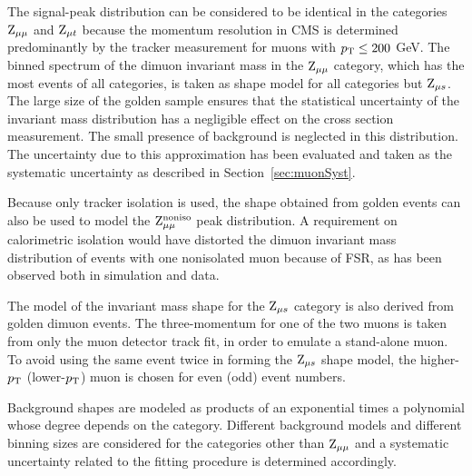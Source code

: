 The signal-peak distribution can be considered to be identical in the categories
$\mathrm{Z}_{\mu\mu}$ and $\mathrm{Z}_{\mu t}$  because the momentum resolution in CMS is determined predominantly
by the tracker measurement for muons with $p_{\mathrm{T}} \leq 200$ GeV.
The binned spectrum of the dimuon invariant mass in the
$\mathrm{Z}_{\mu\mu}$ category, which has the most events of all categories,
is taken as shape model for all categories but $\mathrm{Z}_{\mu s}$.
The large size of the golden sample ensures that the statistical
uncertainty of the invariant mass distribution has a negligible effect on the cross
section measurement.
The small presence of background is neglected in this distribution.
The uncertainty due to this approximation has been evaluated and
taken as the systematic uncertainty as described in Section~\ref{sec:muonSyst}.

Because only tracker isolation is used, the shape obtained from golden events
can also be used to model the $\mathrm{Z}_{\mu\mu}^{\mathrm{noniso}}$ peak distribution.
A requirement on calorimetric isolation would have distorted the dimuon invariant mass
distribution of events with one nonisolated muon because of FSR,
as has been observed both in simulation and data.

The model of the invariant mass shape for the $\mathrm{Z}_{\mu s}$ category is also derived from golden dimuon events.
The three-momentum for one of the two muons is taken from only the muon detector track fit,
in order to emulate a stand-alone muon.
To avoid using the same event twice in forming the $\mathrm{Z}_{\mu s}$ shape model,
the higher-$p_{\mathrm{T}}$ (lower-$p_{\mathrm{T}}$) muon is chosen for even (odd) event numbers.

Background shapes are modeled as products of an exponential times a polynomial
whose degree depends on the category.
Different background models and different binning sizes are considered for the
categories other than $\mathrm{Z}_{\mu\mu}$ and a systematic uncertainty related to the fitting
procedure is determined accordingly.

